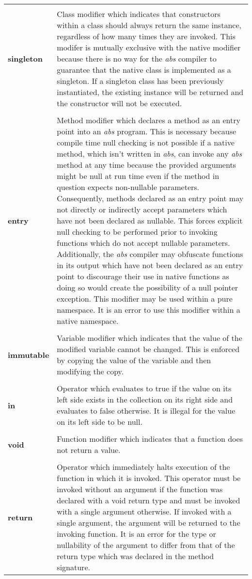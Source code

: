 \documentclass[hidelinks]{article}
\begin{document}
\begin{longtable}{ |p{4cm}|p{11cm}|  }
&\\
\textbf{singleton} & Class modifier which indicates that constructors within a class should always return the same instance, regardless of how many times they are invoked. This modifer is mutually exclusive with the native modifier because there is no way for the \textit{abs} compiler to guarantee that the native class is implemented as a singleton. If a singleton class has been previously instantiated, the existing instance will be returned and the constructor will not be executed.\\
&\\
\textbf{entry} & Method modifier which declares a method as an entry point into an \textit{abs} program. This is necessary because compile time null checking is not possible if a native method, which isn't written in \textit{abs}, can invoke any \textit{abs} method at any time because the provided arguments might be null at run time even if the method in question expects non-nullable parameters. Consequently, methods declared as an entry point may not directly or indirectly accept parameters which have not been declared as nullable. This forces explicit null checking to be performed prior to invoking functions which do not accept nullable parameters. Additionally, the \textit{abs} compiler may obfuscate functions in its output which have not been declared as an entry point to discourage their use in native functions as doing so would create the possibility of a null pointer exception. This modifier may be used within a pure namespace. It is an error to use this modifier within a native namespace. \\
&\\
\textbf{immutable} & Variable modifier which indicates that the value of the modified variable cannot be changed. This is enforced by copying the value of the variable and then modifying the copy. \\
&\\
\textbf{in} & Operator which evaluates to true if the value on its left side exists in the collection on its right side and evaluates to false otherwise. It is illegal for the value on its left side to be null. \\
&\\
\textbf{void} & Function modifier which indicates that a function does not return a value. \\
&\\
\textbf{return} & Operator which immediately halts execution of the function in which it is invoked. This operator must be invoked without an argument if the function was declared with a void return type and must be invoked with a single argument otherwise. If invoked with a single argument, the argument will be returned to the invoking function. It is an error for the type or nullability of the argument to differ from that of the return type which was declared in the method signature. \\

\end{longtable}
\end{document}
